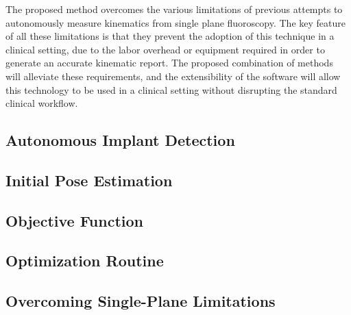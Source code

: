 The proposed method overcomes the various limitations of previous attempts to autonomously measure kinematics from single plane fluoroscopy. The key feature of all these limitations is that they prevent the adoption of this technique in a clinical setting, due to the labor overhead or equipment required in order to generate an accurate kinematic report. The proposed combination of methods will alleviate these requirements, and the extensibility of the software will allow this technology to be used in a clinical setting without disrupting the standard clinical workflow.

\subsection{Autonomous Implant Detection}
\label{sec:implant-detection}


\subsection{Initial Pose Estimation}
\label{sec:pose-estimation}


\subsection{Objective Function}
\label{sec:objective-function}


\subsection{Optimization Routine}
\label{sec:optimization-routine}



\subsection{Overcoming Single-Plane Limitations}
\label{sec:single-plane-limitations}

